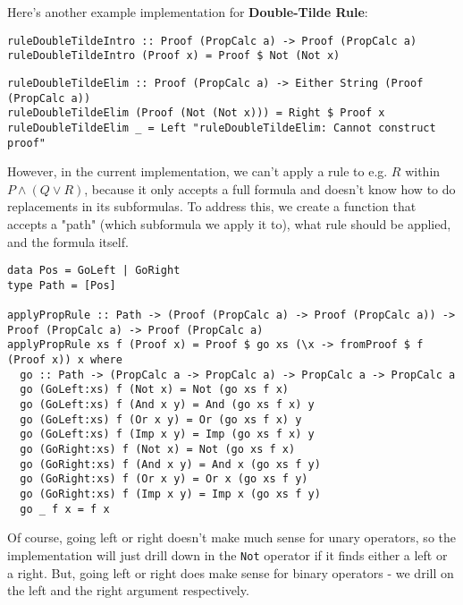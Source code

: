 \documentclass{article}
\begin{document}
Here's another example implementation for \textbf{Double-Tilde Rule}:

\begin{minipage}{0.49\textwidth}
\begin{lstlisting}
ruleDoubleTildeIntro :: Proof (PropCalc a) -> Proof (PropCalc a)
ruleDoubleTildeIntro (Proof x) = Proof $ Not (Not x)
\end{lstlisting}
\end{minipage}
\begin{minipage}{0.49\textwidth}
\begin{lstlisting}
ruleDoubleTildeElim :: Proof (PropCalc a) -> Either String (Proof (PropCalc a))
ruleDoubleTildeElim (Proof (Not (Not x))) = Right $ Proof x
ruleDoubleTildeElim _ = Left "ruleDoubleTildeElim: Cannot construct proof"
\end{lstlisting}
\end{minipage}

However, in the current implementation, we can't apply a rule to e.g. $R$ within $P \land (Q \lor R)$, because it only accepts a full formula and doesn't know how to do replacements in its subformulas. To address this, we create a function that accepts a "path" (which subformula we apply it to), what rule should be applied, and the formula itself.

\begin{lstlisting}
data Pos = GoLeft | GoRight
type Path = [Pos]

applyPropRule :: Path -> (Proof (PropCalc a) -> Proof (PropCalc a)) -> Proof (PropCalc a) -> Proof (PropCalc a)
applyPropRule xs f (Proof x) = Proof $ go xs (\x -> fromProof $ f (Proof x)) x where
  go :: Path -> (PropCalc a -> PropCalc a) -> PropCalc a -> PropCalc a
  go (GoLeft:xs) f (Not x) = Not (go xs f x)
  go (GoLeft:xs) f (And x y) = And (go xs f x) y
  go (GoLeft:xs) f (Or x y) = Or (go xs f x) y
  go (GoLeft:xs) f (Imp x y) = Imp (go xs f x) y
  go (GoRight:xs) f (Not x) = Not (go xs f x)
  go (GoRight:xs) f (And x y) = And x (go xs f y)
  go (GoRight:xs) f (Or x y) = Or x (go xs f y)
  go (GoRight:xs) f (Imp x y) = Imp x (go xs f y)
  go _ f x = f x
\end{lstlisting}

Of course, going left or right doesn't make much sense for unary operators, so the implementation will just drill down in the \texttt{Not} operator if it finds either a left or a right. But, going left or right does make sense for binary operators - we drill on the left and the right argument respectively.
\end{document}
